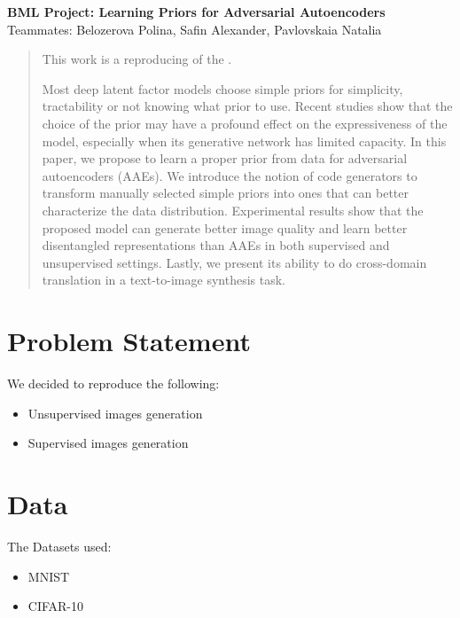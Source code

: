 \documentclass[a4paper, 11pt]{article}
\begin{document}
    \noindent
    \large\textbf{BML Project: Learning Priors for Adversarial Autoencoders} \hfill\\
    \hfill Teammates: Belozerova Polina, Safin Alexander, Pavlovskaia Natalia \\

    \begin{abstract}
        This work is a reproducing of the \cite{original_paper}.

        Most deep latent factor models choose simple priors for simplicity, tractability or
        not knowing what prior to use. Recent studies show that the choice of the prior
        may have a profound effect on the expressiveness of the model, especially when
        its generative network has limited capacity. In this paper, we propose to learn a
        proper prior from data for adversarial autoencoders (AAEs). We introduce the
        notion of code generators to transform manually selected simple priors into ones
        that can better characterize the data distribution. Experimental results show that
        the proposed model can generate better image quality and learn better disentangled
        representations than AAEs in both supervised and unsupervised settings. Lastly,
        we present its ability to do cross-domain translation in a text-to-image synthesis
        task.
    \end{abstract}

    \section*{Problem Statement}
    We decided to reproduce the following:
    \begin{itemize}
        \item {Unsupervised images generation}
        \item {Supervised images generation}
    \end{itemize}

    \section*{Data}
    The Datasets used:
    \begin{itemize}
        \item {MNIST}
        \item {CIFAR-10}
    \end{itemize}
\end{document}
